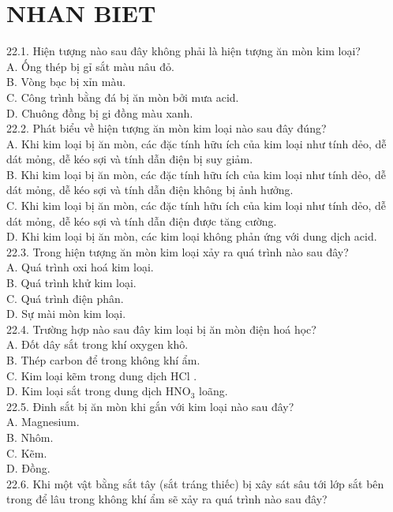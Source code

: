 \documentclass[10pt]{article}
\begin{document}
\section*{NHAN BIET}
22.1. Hiện tượng nào sau đây không phải là hiện tượng ăn mòn kim loại?\\
A. Ống thép bị gỉ sắt màu nâu đỏ.\\
B. Vòng bạc bị xỉn màu.\\
C. Công trình bằng đá bị ăn mòn bởi mưa acid.\\
D. Chuông đồng bị gi đồng màu xanh.\\
22.2. Phát biểu về hiện tượng ăn mòn kim loại nào sau đây đúng?\\
A. Khi kim loại bị ăn mòn, các đặc tính hữu ích của kim loại như tính dẻo, dễ dát mỏng, dễ kéo sợi và tính dẫn điện bị suy giảm.\\
B. Khi kim loại bị ăn mòn, các đặc tính hữu ích của kim loại như tính dẻo, dễ dát mỏng, dễ kéo sợi và tính dẫn điện không bị ảnh hưởng.\\
C. Khi kim loại bị ăn mòn, các đặc tính hữu ích của kim loại như tính dẻo, dễ dát mỏng, dễ kéo sợi và tính dẫn điện được tăng cường.\\
D. Khi kim loại bị ăn mòn, các kim loại không phản ứng với dung dịch acid.\\
22.3. Trong hiện tượng ăn mòn kim loại xảy ra quá trình nào sau đây?\\
A. Quá trình oxi hoá kim loại.\\
B. Quá trình khử kim loại.\\
C. Quá trình điện phân.\\
D. Sự mài mòn kim loại.\\
22.4. Trường hợp nào sau đây kim loại bị ăn mòn điện hoá học?\\
A. Đốt dây sắt trong khí oxygen khô.\\
B. Thép carbon để trong không khí ẩm.\\
C. Kim loại kẽm trong dung dịch HCl .\\
D. Kim loại sắt trong dung dịch $\mathrm{HNO}_{3}$ loãng.\\
22.5. Đinh sắt bị ăn mòn khi gắn với kim loại nào sau đây?\\
A. Magnesium.\\
B. Nhôm.\\
C. Kẽm.\\
D. Đồng.\\
22.6. Khi một vật bằng sắt tây (sắt tráng thiếc) bị xây sát sâu tới lớp sắt bên trong để lâu trong không khí ẩm sẽ xảy ra quá trình nào sau đây?\\
\end{document}
